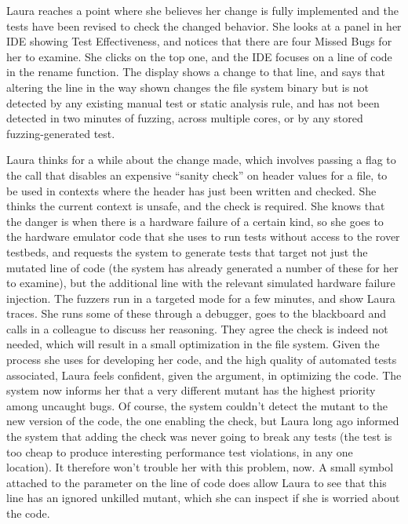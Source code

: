 Laura reaches a point where she believes her change is fully implemented and the tests have been revised to check the changed behavior.  She looks at a panel in her IDE showing Test Effectiveness, and notices that there are four Missed Bugs for her to examine.  She clicks on the top one, and the IDE focuses on a line of code in the rename function.  The display shows a change to that line, and says that altering the line in the way shown changes the file system binary but is not detected by any existing manual test or static analysis rule, and has not been detected in two minutes of fuzzing, across multiple cores, or by any stored fuzzing-generated test.

Laura thinks for a while about the change made, which involves passing a flag to the call that disables an expensive ``sanity check'' on header values for a file, to be used in contexts where the header has just been written and checked.  She thinks the current context is unsafe, and the check is required.  She knows that the danger is when there is a hardware failure of a certain kind, so she goes to the hardware emulator code that she uses to run tests without access to the rover testbeds, and requests the system to generate tests that target not just the mutated line of code (the system has already generated a number of these for her to examine), but the additional line with the relevant simulated hardware failure injection.  The fuzzers run in a targeted mode for a few minutes, and show Laura traces.  She runs some of these through a debugger, goes to the blackboard and calls in a colleague to discuss her reasoning.  They agree the check is indeed not needed, which will result in a small optimization in the file system.  Given the process she uses for developing her code, and the high quality of automated tests associated, Laura feels confident, given the argument, in optimizing the code.  The system now informs her that a very different mutant has the highest priority among uncaught bugs.  Of course, the system couldn't detect the mutant to the new version of the code, the one enabling the check, but Laura long ago informed the system that adding the check was never going to break any tests (the test is too cheap to produce interesting performance test violations, in any one location).  It therefore won't trouble her with this problem, now.  A small symbol attached to the parameter on the line of code does allow Laura to see that this line has an ignored unkilled mutant, which she can inspect if she is worried about the code.

